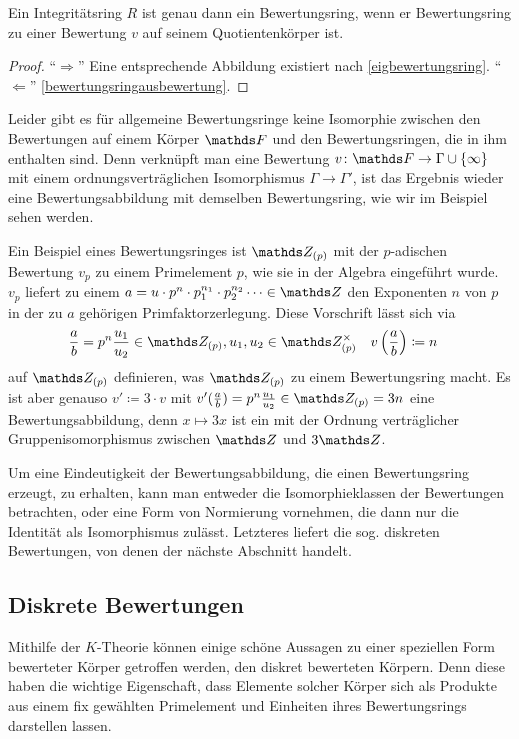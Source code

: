 \documentclass[ngerman,fontsize=11pt, paper=a4, parskip=half, titlepage=true, toc=bib]{scrartcl}
\begin{document}
\begin{Kor}
  Ein Integritätsring $R$ ist genau dann ein Bewertungsring, 
  wenn er Bewertungsring zu einer Bewertung $v$ auf seinem
  Quotientenkörper ist.
  \begin{proof}
    \enquote{$\Rightarrow$} Eine entsprechende Abbildung
    existiert nach \ref{eigbewertungsring}.
    \enquote{$\Leftarrow$} \ref{bewertungsringausbewertung}.
  \end{proof}
\end{Kor}

Leider gibt es für allgemeine Bewertungsringe keine Isomorphie zwischen
den Bewertungen auf einem Körper $\F$ und den Bewertungsringen, die in ihm
enthalten sind. Denn verknüpft man eine Bewertung
$v\colon\F\to\Gamma\cup\{\infty\}$ mit einem ordnungsverträglichen
Isomorphismus $\Gamma\to\Gamma'$, ist das Ergebnis wieder eine
Bewertungsabbildung mit demselben Bewertungsring, wie wir im Beispiel
sehen werden.

\begin{Bsp}
  Ein Beispiel eines Bewertungsringes ist $\Z_{(p)}$ mit der $p$-adischen
  Bewertung $v_p$ zu einem Primelement $p$, 
  wie sie in der Algebra eingeführt wurde.
  $v_p$ liefert zu einem 
  $a=u\cdot p^{n}\cdot p_1^{n_1}\cdot p_2^{n_2}\dotsm\in\Z $ 
  den Exponenten $n$ von $p$ in der zu $a$ gehörigen
  Primfaktorzerlegung.
  Diese Vorschrift lässt sich via
  \begin{align*}
    \frac{a}{b}&=p^n\frac{u_1}{u_2}\in\Z_{(p)}, u_1,u_2\in\Z_{(p)}^\times
                 &v\left(\frac{a}{b}\right)&\coloneqq n
    \end{align*}
    auf $\Z_{(p)}$ definieren, was $\Z_{(p)}$ zu einem Bewertungsring
    macht.
    Es ist aber genauso $v'\coloneqq 3\cdot v$ mit 
    $v'(\frac{a}{b})=p^n\frac{u_1}{u_2}\in\Z_{(p)}=3n$
    eine Bewertungsabbildung, denn $x\mapsto 3x$ ist ein mit der
    Ordnung verträglicher Gruppenisomorphismus zwischen $\Z$ und $3\Z$.
\end{Bsp}

Um eine Eindeutigkeit der Bewertungsabbildung, die einen
Bewertungsring erzeugt, zu erhalten, kann man entweder die
Isomorphieklassen der Bewertungen betrachten, oder eine Form von
Normierung vornehmen, die dann nur die Identität als Isomorphismus
zulässt. Letzteres liefert die sog. diskreten Bewertungen, von denen
der nächste Abschnitt handelt.

\subsection{Diskrete Bewertungen}
Mithilfe der $K$-Theorie können einige schöne Aussagen zu einer
speziellen Form bewerteter Körper getroffen werden, den diskret
bewerteten Körpern. Denn diese haben die wichtige Eigenschaft, 
dass Elemente solcher Körper sich als Produkte aus einem fix gewählten
Primelement und Einheiten ihres Bewertungsrings darstellen lassen.
\end{document}

